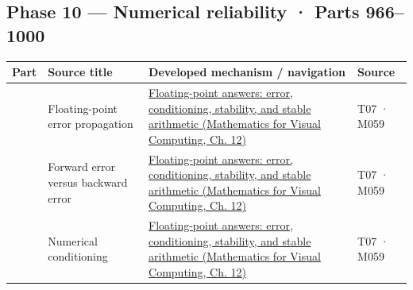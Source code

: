 \subsection{Phase 10 --- Numerical reliability · Parts 966--1000}\label{appendix-fd090d982a15-phase-10-numerical-reliability-parts-9661000}

{\def\LTcaptype{none} %
\begin{longtable}[]{@{}
  >{\raggedleft\arraybackslash}p{}
  >{\raggedright\arraybackslash}p{}
  >{\raggedright\arraybackslash}p{}
  >{\raggedright\arraybackslash}p{}@{}}
\toprule\noalign{}
\begin{minipage}[b]{\linewidth}\raggedleft
Part
\end{minipage} & \begin{minipage}[b]{\linewidth}\raggedright
Source title
\end{minipage} & \begin{minipage}[b]{\linewidth}\raggedright
Developed mechanism / navigation
\end{minipage} & \begin{minipage}[b]{\linewidth}\raggedright
Source
\end{minipage} \\
\midrule\noalign{}
\endhead
\bottomrule\noalign{}
\endlastfoot
966 & Floating-point error propagation & \href{../02-Mathematics-for-Visual-Computing/main.pdf\#nameddest=02-foundations-ii-ch028-floating-point-answers-error-conditioning-stability-and-stable-arithmetic}{Floating-point answers: error, conditioning, stability, and stable arithmetic (Mathematics for Visual Computing, Ch. 12)} & T07 · M059 \\
967 & Forward error versus backward error & \href{../02-Mathematics-for-Visual-Computing/main.pdf\#nameddest=02-foundations-ii-ch028-floating-point-answers-error-conditioning-stability-and-stable-arithmetic}{Floating-point answers: error, conditioning, stability, and stable arithmetic (Mathematics for Visual Computing, Ch. 12)} & T07 · M059 \\
968 & Numerical conditioning & \href{../02-Mathematics-for-Visual-Computing/main.pdf\#nameddest=02-foundations-ii-ch028-floating-point-answers-error-conditioning-stability-and-stable-arithmetic}{Floating-point answers: error, conditioning, stability, and stable arithmetic (Mathematics for Visual Computing, Ch. 12)} & T07 · M059 \\

\end{longtable}}

